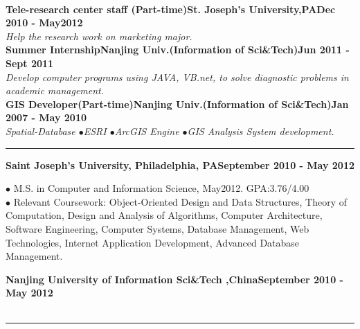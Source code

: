 \documentclass[11pt]{article} %
\begin{document}
\\
\smallskip
\noindent\textbf{ Tele-research center staff (Part-time)\hfill St. Joseph's University,PA\hfill Dec 2010 - May2012}\\
\indent\textit{Help the research work on marketing major.}\\
\smallskip
\noindent\textbf{ Summer Internship\hfill Nanjing Univ.(Information of Sci\&Tech)\hfill Jun 2011 - Sept 2011}\\
\indent\textit{Develop computer programs using JAVA, VB.net, to solve diagnostic problems in academic management.}\\
\smallskip
\noindent\textbf{ GIS Developer(Part-time)\hfill Nanjing Univ.(Information of Sci\&Tech)\hfill Jan 2007 - May 2010}\\
\indent\textit{Spatial-Database $\bullet$ESRI $\bullet$ArcGIS Engine $\bullet$GIS Analysis System development.}\\
\smallskip
{}\hrule
\smallskip
\noindent \textbf{ Saint Joseph's University, Philadelphia, PA\hfill September 2010 - May 2012}
\begin{adjustwidth}{2em}{2em}
{$\bullet$ M.S. in Computer and Information Science, May2012. GPA:3.76/4.00}\\
{$\bullet$ Relevant Coursework: Object-Oriented Design and Data Structures, Theory of Computation, Design and Analysis of Algorithms, Computer Architecture, Software Engineering, Computer Systems, Database Management, Web Technologies, Internet Application Development, Advanced Database Management.}
\end{adjustwidth}
\smallskip
\noindent \textbf{ Nanjing University of Information Sci\&Tech ,China\hfill September 2010 - May 2012}\\
\\
\smallskip
{}\hrule
\end{document}
